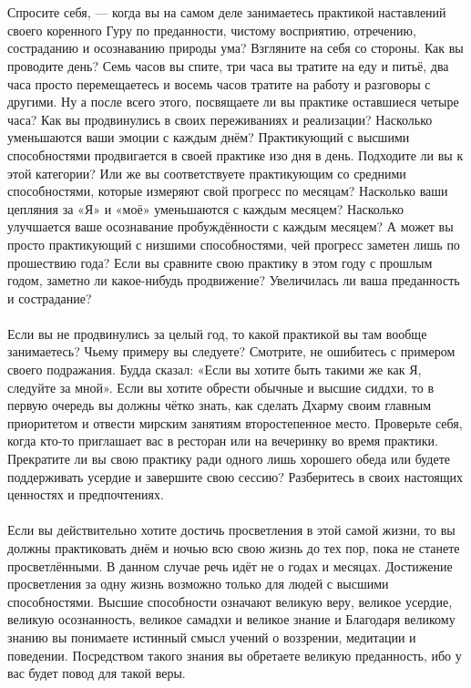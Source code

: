 \\ \\ Спросите себя, — когда вы на самом деле занимаетесь практикой наставлений своего коренного Гуру по преданности, чистому восприятию, отречению, состраданию и осознаванию природы ума? Взгляните на себя со стороны. Как вы проводите день? Семь часов вы спите, три часа вы тратите на еду и питьё, два часа просто перемещаетесь и восемь часов тратите на работу и разговоры с другими. Ну а после всего этого, посвящаете ли вы практике оставшиеся четыре часа? Как вы продвинулись в своих переживаниях и реализации? Насколько уменьшаются ваши эмоции с каждым днём? Практикующий с высшими способностями продвигается в своей практике изо дня в день. Подходите ли вы к этой категории? Или же вы соответствуете практикующим со средними способностями, которые измеряют свой прогресс по месяцам? Насколько ваши цепляния за «Я» и «моё» уменьшаются с каждым месяцем? Насколько улучшается ваше осознавание пробуждённости с каждым месяцем? А может вы просто практикующий с низшими способностями, чей прогресс заметен лишь по прошествию года? Если вы сравните свою практику в этом году с прошлым годом, заметно ли какое-нибудь продвижение? Увеличилась ли ваша преданность и сострадание?
\\ \\ Если вы не продвинулись за целый год, то какой практикой вы там вообще занимаетесь? Чьему примеру вы следуете? Смотрите, не ошибитесь с примером своего подражания. Будда сказал: «Если вы хотите быть такими же как Я, следуйте за мной». Если вы хотите обрести обычные и высшие сиддхи, то в первую очередь вы должны чётко знать, как сделать Дхарму своим главным приоритетом и отвести мирским занятиям второстепенное место. Проверьте себя, когда кто-то приглашает вас в ресторан или на вечеринку во время практики. Прекратите ли вы свою практику ради одного лишь хорошего обеда или будете поддерживать усердие и завершите свою сессию? Разберитесь в своих настоящих ценностях и предпочтениях.
\\ \\ Если вы действительно хотите достичь просветления в этой самой жизни, то вы должны практиковать днём и ночью всю свою жизнь до тех пор, пока не станете просветлёнными. В данном случае речь идёт не о годах и месяцах. Достижение просветления за одну жизнь возможно только для людей с высшими способностями. Высшие способности означают великую веру, великое усердие, великую осознанность, великое самадхи и великое знание и Благодаря великому знанию вы понимаете истинный смысл учений о воззрении, медитации и поведении. Посредством такого знания вы обретаете великую преданность, ибо у вас будет повод для такой веры.

